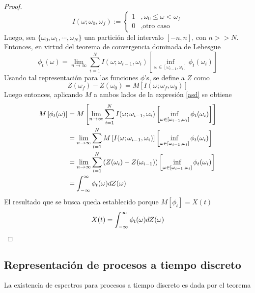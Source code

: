 \begin{proof}
\begin{equation}
I(\omega; \omega_0, \omega_f) := \begin{cases}
1 &, \omega_0 \leq \omega < \omega_f \\
0 &, \text{otro caso}
\end{cases}
\end{equation}
Luego, sea $\{\omega_0, \omega_1, \cdots, \omega_N\}$ una partición del intervalo $[-n,n]$, con $n>>N$. Entonces, en virtud del teorema de convergencia dominada de Lebesgue
\begin{equation}
\phi_t(\omega) = \lim_{n\rightarrow\infty} \sum_{i=1}^{N} I(\omega; \omega_{i-1}, \omega_i) \left[  \inf_{\omega \in [\omega_{i-1},\omega_i]} \phi_t(\omega_{i})\right]
\label{asd}
\end{equation}
Usando tal representación para las funciones $\phi$'s, se define a $Z$ como
\begin{equation}
Z(\omega_f) - Z(\omega_0) = M\left[ I(\omega; \omega_f, \omega_0) \right]
\end{equation}
Luego entonces, aplicando $M$ a ambos lados de la expresión \ref{asd} se obtiene
\begin{align*}
M\left[ \phi_t(\omega) \right] &= M\left[ \lim_{n\rightarrow\infty} \sum_{i=1}^{N} I(\omega; \omega_{i-1}, \omega_i) \left[  \inf_{\omega \in [\omega_{i-1},\omega_i]} \phi_t(\omega_{i})\right] \right] \\
&= \lim_{n\rightarrow\infty} \sum_{i=1}^{N} M\left[I(\omega; \omega_{i-1}, \omega_i) \right] \left[  \inf_{\omega \in [\omega_{i-1},\omega_i]} \phi_t(\omega_{i})\right] \\
&= \lim_{n\rightarrow\infty} \sum_{i=1}^{N} \left( Z(\omega_i) - Z(\omega_{i-1})\right) \left[  \inf_{\omega \in [\omega_{i-1},\omega_i]} \phi_t(\omega_{i})\right] \\
&= \int_{-\infty}^{\infty} \phi_t(\omega) dZ(\omega)
\end{align*}
El resultado que se busca queda establecido porque $M[\phi_t] = X(t)$
\begin{equation}
X(t) = \int_{-\infty}^{\infty} \phi_t(\omega) dZ(\omega)
\end{equation}
\end{proof}

\subsection{Representación de procesos a tiempo discreto}

La existencia de espectros para procesos a tiempo discreto es dada por el teorema


